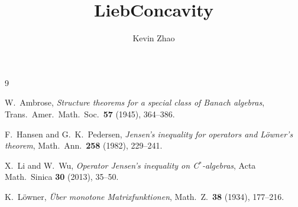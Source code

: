 \documentclass{report}
\title{LiebConcavity}
\author{Kevin Zhao}
\begin{document}
\maketitle


\begin{thebibliography}{9}

W.~Ambrose,
\emph{Structure theorems for a special class of Banach algebras},
Trans.\ Amer.\ Math.\ Soc.\ \textbf{57} (1945), 364--386.

F.~Hansen and G.~K.~Pedersen,
\emph{Jensen's inequality for operators and L\"{o}wner's theorem},
Math.\ Ann.\ \textbf{258} (1982), 229--241.

X.~Li and W.~Wu,
\emph{Operator Jensen's inequality on C$^*$-algebras},
Acta Math.\ Sinica \textbf{30} (2013), 35--50.

K.~L\"{o}wner,
\emph{\"{U}ber monotone Matrixfunktionen},
Math.\ Z.\ \textbf{38} (1934), 177--216.

\end{thebibliography}
\end{document}
